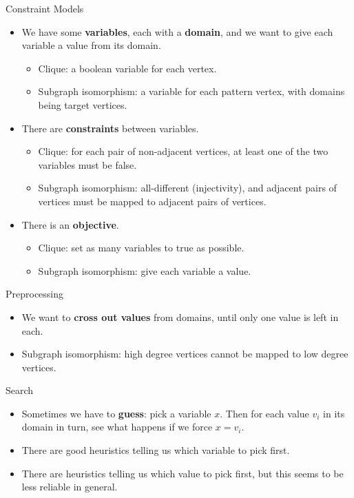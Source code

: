 \documentclass{beamer}
\begin{document}
\begin{frame}{Constraint Models}
    \begin{itemize}
        \item We have some \textbf{variables}, each with a \textbf{domain}, and we want to give each
            variable a value from its domain.
            \begin{itemize}
                \item Clique: a boolean variable for each vertex.
                \item Subgraph isomorphism: a variable for each pattern vertex, with domains being
                    target vertices.
            \end{itemize}
        \item There are \textbf{constraints} between variables.
            \begin{itemize}
                \item Clique: for each pair of non-adjacent vertices, at least one of the two
                    variables must be false.
                \item Subgraph isomorphism: all-different (injectivity), and adjacent pairs of
                    vertices must be mapped to adjacent pairs of vertices.
            \end{itemize}
        \item There is an \textbf{objective}.
            \begin{itemize}
                \item Clique: set as many variables to true as possible.
                \item Subgraph isomorphism: give each variable a value.
            \end{itemize}
    \end{itemize}
\end{frame}

\begin{frame}{Preprocessing}
    \begin{itemize}
        \item We want to \textbf{cross out values} from domains, until only one value is left in
            each.
        \item Subgraph isomorphism: high degree vertices cannot be mapped to low degree vertices.
    \end{itemize}
\end{frame}

\begin{frame}{Search}
    \begin{itemize}
        \item Sometimes we have to \textbf{guess}: pick a variable $x$. Then for each value $v_i$ in
            its domain in turn, see what happens if we force $x = v_i$.
        \item There are good heuristics telling us which variable to pick first.
        \item There are heuristics telling us which value to pick first, but this seems to be
            less reliable in general.
    \end{itemize}
\end{frame}
\end{document}
